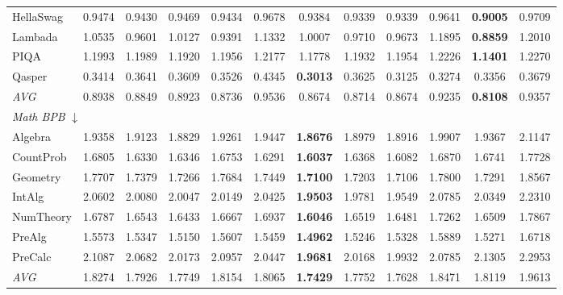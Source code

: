 \begin{table}[htbp]
\begin{tabular}{lccccccccccc}
HellaSwag & 0.9474 & 0.9430 & 0.9469 & 0.9434 & 0.9678 & 0.9384 & 0.9339 & 0.9339 & 0.9641 & \textbf{0.9005} & 0.9709 \\
Lambada & 1.0535 & 0.9601 & 1.0127 & 0.9391 & 1.1332 & 1.0007 & 0.9710 & 0.9673 & 1.1895 & \textbf{0.8859} & 1.2010 \\
PIQA & 1.1993 & 1.1989 & 1.1920 & 1.1956 & 1.2177 & 1.1778 & 1.1932 & 1.1954 & 1.2226 & \textbf{1.1401} & 1.2270 \\
Qasper & 0.3414 & 0.3641 & 0.3609 & 0.3526 & 0.4345 & \textbf{0.3013} & 0.3625 & 0.3125 & 0.3274 & 0.3356 & 0.3679 \\
\textit{AVG} & 0.8938 & 0.8849 & 0.8923 & 0.8736 & 0.9536 & 0.8674 & 0.8714 & 0.8674 & 0.9235 & \textbf{0.8108} & 0.9357 \\
\midrule
\multicolumn{12}{l}{\textit{Math BPB} $\downarrow$} \\
Algebra & 1.9358 & 1.9123 & 1.8829 & 1.9261 & 1.9447 & \textbf{1.8676} & 1.8979 & 1.8916 & 1.9907 & 1.9367 & 2.1147 \\
CountProb & 1.6805 & 1.6330 & 1.6346 & 1.6753 & 1.6291 & \textbf{1.6037} & 1.6368 & 1.6082 & 1.6870 & 1.6741 & 1.7728 \\
Geometry & 1.7707 & 1.7379 & 1.7266 & 1.7684 & 1.7449 & \textbf{1.7100} & 1.7203 & 1.7106 & 1.7800 & 1.7291 & 1.8567 \\
IntAlg & 2.0602 & 2.0080 & 2.0047 & 2.0149 & 2.0425 & \textbf{1.9503} & 1.9781 & 1.9549 & 2.0785 & 2.0349 & 2.2310 \\
NumTheory & 1.6787 & 1.6543 & 1.6433 & 1.6667 & 1.6937 & \textbf{1.6046} & 1.6519 & 1.6481 & 1.7262 & 1.6509 & 1.7867 \\
PreAlg & 1.5573 & 1.5347 & 1.5150 & 1.5607 & 1.5459 & \textbf{1.4962} & 1.5246 & 1.5328 & 1.5889 & 1.5271 & 1.6718 \\
PreCalc & 2.1087 & 2.0682 & 2.0173 & 2.0957 & 2.0447 & \textbf{1.9681} & 2.0168 & 1.9932 & 2.0785 & 2.1305 & 2.2953 \\
\textit{AVG} & 1.8274 & 1.7926 & 1.7749 & 1.8154 & 1.8065 & \textbf{1.7429} & 1.7752 & 1.7628 & 1.8471 & 1.8119 & 1.9613 \\
\bottomrule
\end{tabular}
\end{table}

